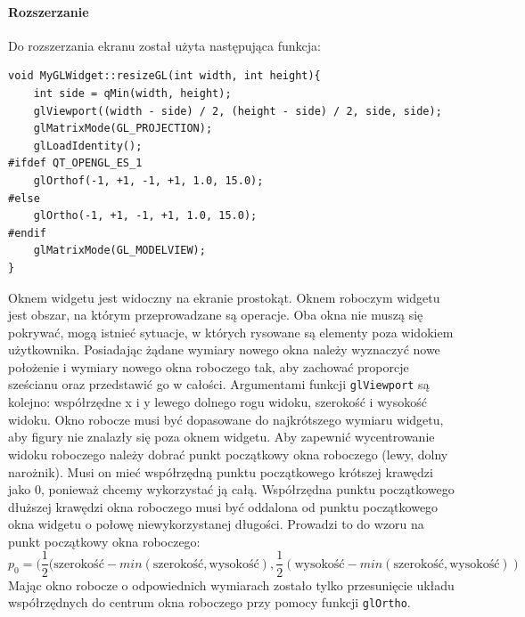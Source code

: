 \paragraph{Rozszerzanie}
Do rozszerzania ekranu został użyta następująca funkcja:
\begin{lstlisting}
void MyGLWidget::resizeGL(int width, int height){
    int side = qMin(width, height);
    glViewport((width - side) / 2, (height - side) / 2, side, side);
    glMatrixMode(GL_PROJECTION);
    glLoadIdentity();
#ifdef QT_OPENGL_ES_1
    glOrthof(-1, +1, -1, +1, 1.0, 15.0);
#else
    glOrtho(-1, +1, -1, +1, 1.0, 15.0);
#endif
    glMatrixMode(GL_MODELVIEW);
}
\end{lstlisting}
Oknem widgetu jest widoczny na ekranie prostokąt. Oknem roboczym widgetu jest obszar, na którym przeprowadzane są operacje. Oba okna nie muszą się pokrywać, mogą istnieć sytuacje, w których rysowane są elementy poza widokiem użytkownika. Posiadając żądane wymiary nowego okna należy wyznaczyć nowe położenie i wymiary nowego okna roboczego tak, aby zachować proporcje sześcianu oraz przedstawić go w całości. Argumentami funkcji \texttt{glViewport} są kolejno: współrzędne x i y lewego dolnego rogu widoku, szerokość i wysokość widoku. Okno robocze musi być dopasowane do najkrótszego wymiaru widgetu, aby figury nie znalazły się poza oknem widgetu. Aby zapewnić wycentrowanie widoku roboczego należy dobrać punkt początkowy okna roboczego (lewy, dolny narożnik). Musi on mieć współrzędną punktu początkowego krótszej krawędzi jako 0, ponieważ chcemy wykorzystać ją całą. Współrzędna punktu początkowego dłuższej krawędzi okna roboczego musi być oddalona od punktu początkowego okna widgetu o połowę niewykorzystanej długości. Prowadzi to do wzoru na punkt początkowy okna roboczego: 
\begin{equation}
p_0=(\frac{1}{2}(\text{szerokość}-min(\text{szerokość}, \text{wysokość}),\frac{1}{2}(\text{wysokość}-min(\text{szerokość}, \text{wysokość}))
\end{equation}
Mając okno robocze o odpowiednich wymiarach zostało tylko przesunięcie układu współrzędnych do centrum okna roboczego przy pomocy funkcji \texttt{glOrtho}.
